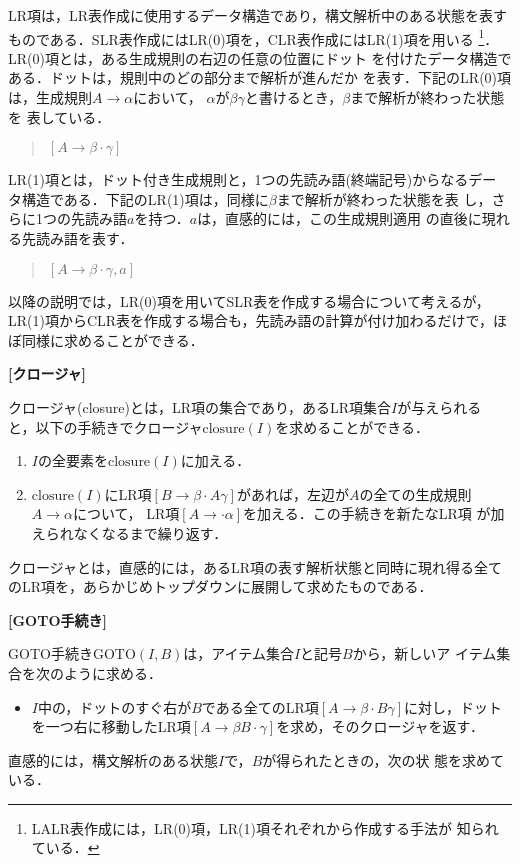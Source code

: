 LR項は，LR表作成に使用するデータ構造であり，構文解析中のある状態を表す
ものである．SLR表作成にはLR(0)項を，CLR表作成にはLR(1)項を用いる
\footnote{ LALR表作成には，LR(0)項，LR(1)項それぞれから作成する手法が
  知られている．}．LR(0)項とは，ある生成規則の右辺の任意の位置にドット
を付けたデータ構造である．ドットは，規則中のどの部分まで解析が進んだか
を表す．下記のLR(0)項は，生成規則$A \rightarrow \alpha$において，
$\alpha$が$\beta \gamma$と書けるとき，$\beta$まで解析が終わった状態を
表している．
\begin{quote}
  $[ A \rightarrow \beta \cdot \gamma ]$
\end{quote}

LR(1)項とは，ドット付き生成規則と，1つの先読み語(終端記号)からなるデー
タ構造である．下記のLR(1)項は，同様に$\beta$まで解析が終わった状態を表
し，さらに1つの先読み語$a$を持つ．$a$は，直感的には，この生成規則適用
の直後に現れる先読み語を表す．
\begin{quote}
  $[ A \rightarrow \beta \cdot \gamma, a ]$
\end{quote}

以降の説明では，LR(0)項を用いてSLR表を作成する場合について考えるが，
LR(1)項からCLR表を作成する場合も，先読み語の計算が付け加わるだけで，ほ
ぼ同様に求めることができる．

{\flushleft \bf [クロージャ]}

クロージャ(closure)とは，LR項の集合であり，あるLR項集合$I$が与えられる
と，以下の手続きでクロージャ$\mbox{closure}(I)$を求めることができる．
\begin{enumerate}
\item $I$の全要素を$\mbox{closure}(I)$に加える．
    
\item $\mbox{closure}(I)$にLR項$[ B \rightarrow \beta \cdot A \gamma
  ]$があれば，左辺が$A$の全ての生成規則$A \rightarrow \alpha$について，
  LR項$[ A \rightarrow \cdot \alpha ]$を加える．この手続きを新たなLR項
  が加えられなくなるまで繰り返す．
\end{enumerate}
クロージャとは，直感的には，あるLR項の表す解析状態と同時に現れ得る全て
のLR項を，あらかじめトップダウンに展開して求めたものである．

{\flushleft \bf [GOTO手続き]}

GOTO手続き$\mbox{GOTO}(I,B)$は，アイテム集合$I$と記号$B$から，新しいア
イテム集合を次のように求める．
\begin{itemize}
\item $I$中の，ドットのすぐ右が$B$である全てのLR項$[ A \rightarrow
  \beta \cdot B \gamma ]$に対し，ドットを一つ右に移動したLR項$[ A
  \rightarrow \beta B \cdot \gamma ]$を求め，そのクロージャを返す．
\end{itemize}
直感的には，構文解析のある状態$I$で，$B$が得られたときの，次の状
態を求めている．

